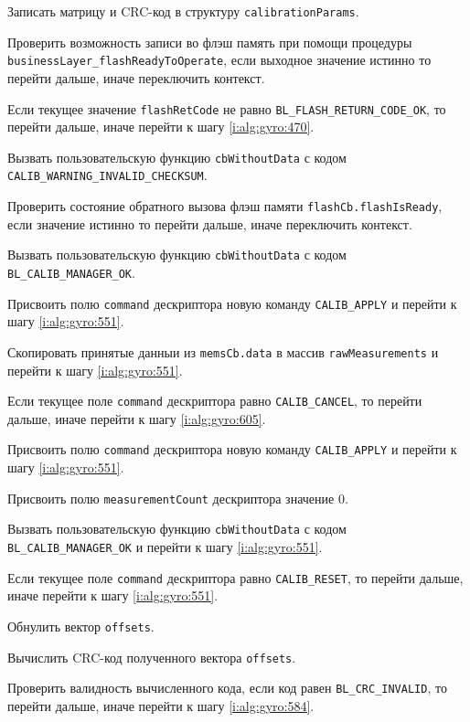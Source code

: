 \begin{enumerate_step}
    \item \label{i:alg:gyro:584} Записать матрицу и CRC-код в структуру \lstinline|calibrationParams|.
    \item Проверить возможность записи во флэш память при помощи процедуры \lstinline|businessLayer_flashReadyToOperate|, если выходное значение истинно то перейти дальше, иначе переключить контекст.
    \item Если текущее значение \lstinline|flashRetCode| не равно \lstinline|BL_FLASH_RETURN_CODE_OK|, то перейти дальше, иначе перейти к шагу
    \ref{i:alg:gyro:470}.
    \item Вызвать пользовательскую функцию \lstinline|cbWithoutData| с кодом \lstinline|CALIB_WARNING_INVALID_CHECKSUM|.
    \item \label{i:alg:gyro:470} Проверить состояние обратного вызова флэш памяти \lstinline|flashCb.flashIsReady|, если значение истинно то перейти дальше, иначе переключить контекст.
    \item Вызвать пользовательскую функцию \lstinline|cbWithoutData| с кодом \lstinline|BL_CALIB_MANAGER_OK|.
    \item Присвоить полю \lstinline|command| дескриптора  новую команду \lstinline|CALIB_APPLY| и перейти к шагу \ref{i:alg:gyro:551}.

    \item \label{i:alg:gyro:591} Скопировать принятые данныи из \lstinline|memsCb.data| в массив \lstinline|rawMeasurements| и перейти к шагу \ref{i:alg:gyro:551}.

    \item \label{i:alg:gyro:599} Если текущее поле \lstinline|command| дескриптора равно \lstinline|CALIB_CANCEL|, то перейти дальше, иначе перейти к шагу
    \ref{i:alg:gyro:605}.
    \item Присвоить полю \lstinline|command| дескриптора  новую команду \lstinline|CALIB_APPLY| и перейти к шагу \ref{i:alg:gyro:551}.
    \item Присвоить полю \lstinline|measurementCount| дескриптора значение 0.
    \item Вызвать пользовательскую функцию \lstinline|cbWithoutData| с кодом \lstinline|BL_CALIB_MANAGER_OK| и перейти к шагу \ref{i:alg:gyro:551}.
 
    \item \label{i:alg:gyro:605} Если текущее поле \lstinline|command| дескриптора равно \lstinline|CALIB_RESET|, то перейти дальше, иначе перейти к шагу
    \ref{i:alg:gyro:551}.
    \item Обнулить вектор \lstinline|offsets|.
    \item Вычислить CRC-код полученного вектора \lstinline|offsets|.
    \item Проверить валидность вычисленного кода, если код равен \lstinline|BL_CRC_INVALID|, то перейти дальше, иначе перейти к шагу \ref{i:alg:gyro:584}.

\end{enumerate_step}

